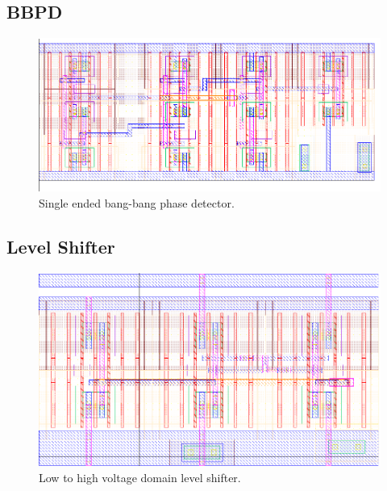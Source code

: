 		\subsection{BBPD}\label{sec:lay_bbpd}
			\begin{figure}[htb!]
			        \centering
			        \includegraphics[width=\textwidth, angle=0]{./figs/layout/layout_bbpd}
			    \caption{Single ended bang-bang phase detector.}
			\end{figure}
		\subsection{Level Shifter}\label{sec:lay_ls}
			\begin{figure}[htb!]
			        \centering
			        \includegraphics[width=\textwidth, angle=0]{./figs/layout/ls}
			    \caption{Low to high voltage domain level shifter.}
			\end{figure}
		\FloatBarrier\pagebreak
